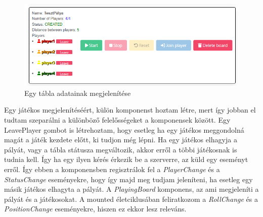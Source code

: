 \documentclass[a4paper,twoside]{article}
\begin{document}
\begin{figure}
	\caption{Egy tábla adatainak megjelenítése}
	\label{board}
	\centering
	\includegraphics[scale=0.8]{board}
\end{figure}
\FloatBarrier
Egy játékos megjelenítéséért, külön komponenst hoztam létre, mert így jobban el tudtam szeparálni a különböző felelősségeket a komponensek között. Egy LeavePlayer gombot is létrehoztam, hogy esetleg ha egy játékos meggondolná magát a játék kezdete előtt, ki tudjon még lépni. 
Ha egy játékos elhagyja a pályát, vagy a tábla státusza megváltozik, akkor erről a többi játékosnak is tudnia kell. Így ha egy ilyen kérés érkezik be a szerverre, az küld egy eseményt erről. Így ebben a komponensben regisztrálok fel a \textit{PlayerChange} és a \textit{StatusChange} eseményekre, hogy így majd meg tudjam jeleníteni, ha esetleg egy másik játékos elhagyta a pályát. A \textit{PlayingBoard} komponens, az ami megjeleníti a pályát és a játékosokat. A mounted életciklusában feliratkozom a \textit{RollChange} és a \textit{PositionChange} eseményekre, hiszen ez ekkor lesz releváns. 
\end{document}
